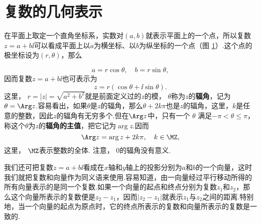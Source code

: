 \section{复数的几何表示\label{sec1.2}}
在平面上取定一个直角坐标系，实数对$(a,b)$就表示平面上的一个点，所以复数$z=a+b\ii$可以看成平面上以$a$为横坐标、以$b$为纵坐标的一个点（图 \ref{fig1.1}）.这个点的极坐标设为$(r,\theta)$，那么
\begin{figure}[!ht]
\centering
{}
\caption{}\label{fig1.1}
\end{figure}
\[a=r\cos\theta,\quad b=r\sin\theta,\]
因而复数$z=a+b\ii$也可表示为
\[z=r(\cos\theta+\ii\sin\theta).\]
这里， $r=|z|=\sqrt{a^2+b^2}$就是前面定义过的$z$的模， $\theta$称为$z$的\textbf{辐角}，记为$\theta=\Arg z$.容易看出，如果$\theta$是$z$的辐角，那么$\theta+2k\pi$也是$z$的辐角，这里，$k$是任意的整数，因此$z$的辐角有无穷多个.但在$\Arg z$中，只有一个 $\theta$ 满足$-\pi<\theta\le\pi$，称这个$\theta$为$z$的\textbf{辐角的主值}，把它记为$\arg z$.因而
\[\Arg z=\arg z+2k\pi,\quad k\in\MZ,\]
这里， $\MZ$表示整数的全体. 注意， $0$的辐角没有意义.

我们还可把复数$z=a+b\ii$看成在$x$轴和$y$轴上的投影分别为$a$和$b$的一个向量，这时我们就把复数和向量作为同义语来使用.容易知道，由一向量经过平行移动所得的所有向量表示的是同一个复数.如果一个向量的起点和终点分别为复数$z_1$和$z_2$，那么这个向量所表示的复数便是$z_2-z_1$，因而$|z_2-z_1|$就表示$z_1$与$z_2$之间的距离.特别地，当一个向量的起点为原点时，它的终点所表示的复数和向量所表示的复数是一致的.

